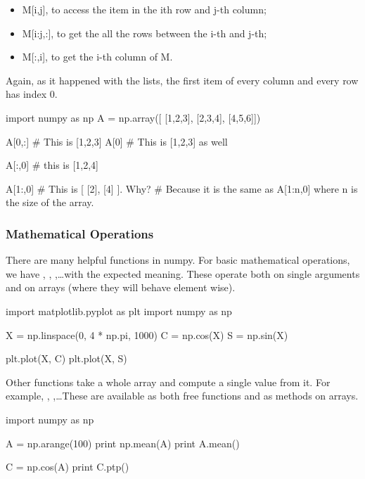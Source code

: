 \begin{itemize}
 \item M[i,j], to access the item in the ith row and j-th column; 
 \item M[i:j,:], to get the all the rows between the i-th and j-th;
 \item M[:,i], to get the i-th column of M.
\end{itemize}

Again, as it happened with the lists, the first item of every column and every row has index 0.

\begin{python}
import numpy as np
A = np.array([
    [1,2,3],
    [2,3,4],
    [4,5,6]])

A[0,:] # This is [1,2,3]
A[0] # This is [1,2,3] as well

A[:,0] # this is [1,2,4]

A[1:,0] # This is [ [2], [4] ]. Why?
        # Because it is the same as A[1:n,0] where n is the size of the array.
\end{python}

\subsubsection{Mathematical Operations}

There are many helpful functions in numpy. For basic mathematical operations, we have , ,
,\ldots with the expected meaning. These operate both on single
arguments and on arrays (where they will behave element wise).

\begin{python}
import matplotlib.pyplot as plt
import numpy as np

X = np.linspace(0, 4 * np.pi, 1000)
C = np.cos(X)
S = np.sin(X)

plt.plot(X, C)
plt.plot(X, S)
\end{python}

Other functions take a whole array and compute a single value from it. For
example, , ,\ldots These are available as both free
functions and as methods on arrays.

\begin{python}
import numpy as np

A = np.arange(100)
print np.mean(A)
print A.mean()

C = np.cos(A)
print C.ptp()
\end{python}


